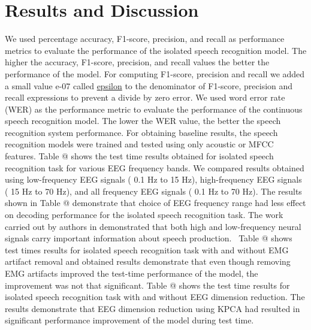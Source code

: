 \documentclass[letterpaper, 10 pt, conference]{ieeeconf}  %
\makeatletter
\newcommand*{\rom}[1]{\expandafter\@slowromancap\romannumeral #1@}
\makeatother
\begin{document}
\section{Results and Discussion}

We used percentage accuracy, F1-score, precision, and recall \cite{goutte2005probabilistic} as performance metrics to evaluate the performance of the isolated speech recognition model. The higher the accuracy, F1-score, precision, and recall values the better the performance of the model. For computing F1-score, precision and recall we added a small value e-07 called  \href{https://www.tensorflow.org/api_docs/python/tf/keras/backend/epsilon}{epsilon} to the denominator of F1-score, precision and recall expressions to prevent a divide by zero error. 
We used word error rate (WER) as the performance metric to evaluate the performance of the continuous speech recognition model. The lower the WER value, the better the speech recognition system performance. For obtaining baseline results, the speech recognition models were trained and tested using only acoustic or MFCC features. Table \rom{2} shows the test time results obtained for isolated speech recognition task for various EEG frequency bands. We compared results obtained using low-frequency EEG signals ( 0.1 Hz to 15 Hz), high-frequency EEG signals ( 15 Hz to 70 Hz), and all frequency EEG signals ( 0.1 Hz to 70 Hz). The results shown in Table \rom{2} demonstrate that choice of EEG frequency range had less effect on decoding performance for the isolated speech recognition task. The work carried out by authors in \cite{anumanchipalli2019speech} demonstrated that both high and low-frequency neural signals carry important information about speech production. 
Table \rom{3} shows test times results for isolated speech recognition task with and without EMG artifact removal and obtained results demonstrate that even though removing EMG artifacts improved the test-time performance of the model, the improvement was not that significant. Table \rom{4} shows the test time results for isolated speech recognition task with and without EEG dimension reduction. The results demonstrate that EEG dimension reduction using KPCA had resulted in significant performance improvement of the model during test time. 
\end{document}
